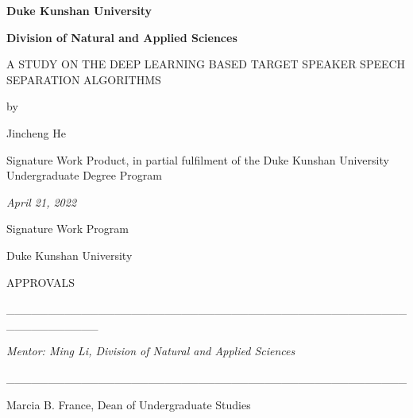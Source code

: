 \documentclass[11pt]{article}
\author{}
\date{}
\begin{document}
    \begin{spacing}{1.5}
        \textbf{Duke Kunshan University}

        \textbf{Division of Natural and Applied Sciences}

        A STUDY ON THE DEEP LEARNING BASED TARGET SPEAKER SPEECH SEPARATION ALGORITHMS

        by

        Jincheng He

        Signature Work Product, in partial fulfilment of the Duke Kunshan
        University Undergraduate Degree Program

        \emph{April 21, 2022}

        Signature Work Program

        Duke Kunshan University

        APPROVALS

        \_\_\_\_\_\_\_\_\_\_\_\_\_\_\_\_\_\_\_\_\_\_\_\_\_\_\_\_\_\_\_\_\_\_\_\_\_\_\_\_\_\_\_\_\_\_\_\_\_\_\_\_\_\_\_\_\_\_\_

        \emph{Mentor: Ming Li, Division of Natural and Applied Sciences}

        \_\_\_\_\_\_\_\_\_\_\_\_\_\_\_\_\_\_\_\_\_\_\_\_\_\_\_\_\_\_\_\_\_\_\_\_\_\_\_\_\_\_\_\_\_\_\_\_

        Marcia B. France, Dean of Undergraduate Studies


        \newpage
        

        \newpage
        

        \newpage
        \tableofcontents

        \newpage


        

        

        

        

        
        
    \end{spacing}
\end{document}
